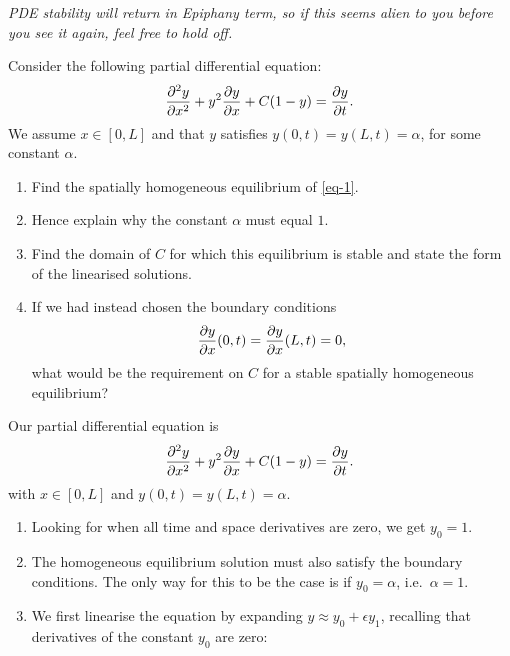 \documentclass[a4paper, 12pt]{article}
\begin{document}
\begin{enumerate}[label={\bf \arabic{*}.\;}, ref={\arabic{*}},itemsep=3ex, left=0ex]
{    }


    {
      \emph{PDE stability will return in Epiphany term, so if this seems alien to you before you see it again, feel free to hold off.}

      Consider the following partial differential equation:
      \begin{equation}
        \pdd{y}{x}  + y^2\pd{y}{x} +C(1-y) = \pd{y}{t}.
        \label{eq-1}
      \end{equation}
      We assume $x\in[0,L]$ and that $y$ satisfies $y(0,t)=y(L,t)=\alpha$, for some constant $\alpha$.
      \begin{enumerate}[label=(\alph*)]
        \item Find the spatially homogeneous equilibrium of \cref{eq-1}.
        \item Hence explain why the constant $\alpha$ must equal $1$.
        \item Find the domain of $C$ for which this equilibrium is stable and state the form of the linearised solutions.
        \item If we had instead chosen the boundary conditions
          \begin{equation}
            \pd{y}{x}(0,t) = \pd{y}{x}(L,t) = 0,
          \end{equation}
          what would be the requirement on $C$ for a stable spatially homogeneous equilibrium?
      \end{enumerate}
    }
    {
      \label{lambda-real-q}
      Our partial differential equation is
      \begin{equation}
        \pdd{y}{x}  + y^2\pd{y}{x} +C(1-y) = \pd{y}{t}.
      \end{equation}
      with $x\in[0,L]$ and $y(0,t)=y(L,t)=\alpha$.
      \begin{enumerate}[label=(\alph*)]
        \item{Looking for when all time and space derivatives are zero, we get $y_0=1$.
          }
        \item The homogeneous equilibrium solution must also satisfy the boundary conditions. The only way for this to be the case is if $y_0=\alpha$, i.e.\ $\alpha = 1$.
        \item{\label{lambda-real}We first linearise the equation by expanding $y \approx y_0 + \epsilon y_1$, recalling that derivatives of the constant $y_0$ are zero:
}
\end{enumerate}}
\end{enumerate}
\end{document}
